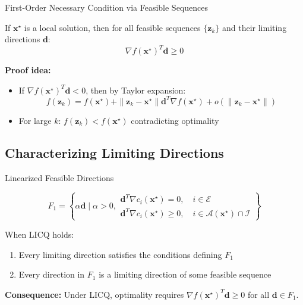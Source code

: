 \documentclass[aspectratio=1610]{beamer}
\begin{document}
\begin{frame}{First-Order Necessary Condition via Feasible Sequences}
  \begin{theorem}
    If $\mathbf{x}^{\star}$ is a local solution, then for all feasible sequences $\{\mathbf{z}_k\}$ and their limiting directions $\mathbf{d}$:
    $$\nabla f(\mathbf{x}^{\star})^T \mathbf{d} \geq 0$$
  \end{theorem}
  
  \textbf{Proof idea:}
  \begin{itemize}
    \item If $\nabla f(\mathbf{x}^{\star})^T \mathbf{d} < 0$, then by Taylor expansion:
    $$f(\mathbf{z}_k) = f(\mathbf{x}^{\star}) + \|\mathbf{z}_k - \mathbf{x}^{\star}\| \mathbf{d}^T \nabla f(\mathbf{x}^{\star}) + o(\|\mathbf{z}_k - \mathbf{x}^{\star}\|)$$
    \item For large $k$: $f(\mathbf{z}_k) < f(\mathbf{x}^{\star})$ contradicting optimality
  \end{itemize}
\end{frame}

\subsection{Characterizing Limiting Directions}
\begin{frame}{Linearized Feasible Directions}
  \begin{definition}
    $$F_1 = \left\{\alpha \mathbf{d} \mid \alpha > 0, \begin{array}{l}
    \mathbf{d}^T \nabla c_i(\mathbf{x}^{\star}) = 0, \quad i \in \mathcal{E} \\
    \mathbf{d}^T \nabla c_i(\mathbf{x}^{\star}) \geq 0, \quad i \in \mathcal{A}(\mathbf{x}^{\star}) \cap \mathcal{I}
    \end{array}\right\}$$
  \end{definition}
  
  \begin{lemma}
    When LICQ holds:
    \begin{enumerate}
      \item Every limiting direction satisfies the conditions defining $F_1$
      \item Every direction in $F_1$ is a limiting direction of some feasible sequence
    \end{enumerate}
  \end{lemma}
  
  \textbf{Consequence:} Under LICQ, optimality requires $\nabla f(\mathbf{x}^{\star})^T \mathbf{d} \geq 0$ for all $\mathbf{d} \in F_1$.
\end{frame}
\end{document}
